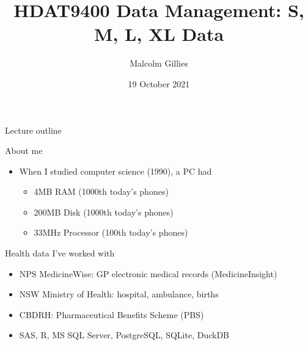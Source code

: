 \documentclass[aspectratio=169,12pt,usepdftitle=false]{beamer} %
\title{HDAT9400 Data Management: S, M, L, XL Data}
\institute{\url{https://github.com/mbg-unsw/hdat9400}}
\author{Malcolm Gillies}
\date{19 October 2021}
\begin{document}
{
\begin{frame}
\titlepage
\end{frame}
}

{
\begin{frame}[plain]
\end{frame}
}

\begin{frame}{Lecture outline}
\end{frame}

\begin{frame}{About me}
    \begin{itemize}
        \item When I studied computer science (1990), a PC had
	    \begin{itemize}
		\item 4MB RAM (1000th today's phones)
		\item 200MB Disk (1000th today's phones)
		\item 33MHz Processor (100th today's phones)
	    \end{itemize}
    \end{itemize}
\end{frame}

\begin{frame}{Health data I've worked with}
    \begin{itemize}
	\item NPS MedicineWise: GP electronic medical records (MedicineInsight)
	\item NSW Ministry of Health: hospital, ambulance, births
	\item CBDRH: Pharmaceutical Benefits Scheme (PBS)
	\item SAS, R, MS SQL Server, PostgreSQL, SQLite, DuckDB
    \end{itemize}
\end{frame}
\end{document}

